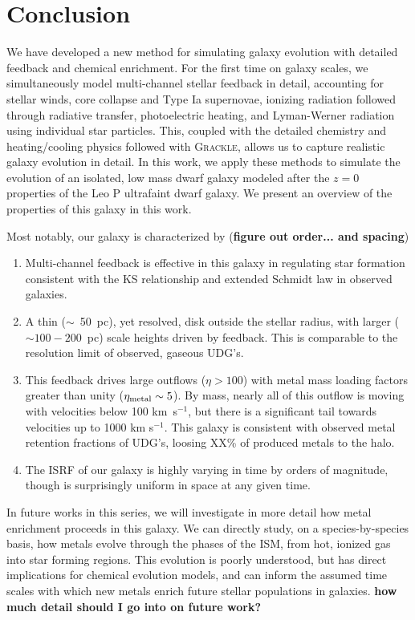 \documentclass[twocolumn]{aastex61}
\begin{document}
\section{Conclusion}
\label{sec:conclusion}
We have developed a new method for simulating galaxy evolution with detailed feedback and chemical enrichment. For the first time on galaxy scales, we simultaneously model multi-channel stellar feedback in detail, accounting for stellar winds, core collapse and Type Ia supernovae, ionizing radiation followed through radiative transfer, photoelectric heating, and Lyman-Werner radiation using individual star particles. This, coupled with the detailed chemistry and heating/cooling physics followed with \textsc{Grackle}, allows us to capture realistic galaxy evolution in detail. In this work, we apply these methods to simulate the evolution of an isolated, low mass dwarf galaxy modeled after the $z=0$ properties of the Leo P ultrafaint dwarf galaxy. We present an overview of the properties of this galaxy in this work.

Most notably, our galaxy is characterized by (\textbf{figure out order... and spacing})
\begin{enumerate}
\item Multi-channel feedback is effective in this galaxy in regulating star formation consistent with the KS relationship and extended Schmidt law in observed galaxies. 
\item A thin ($\sim$~50~pc), yet resolved, disk outside the stellar radius, with larger ($\sim 100 - 200$~pc) scale heights driven by feedback. This is comparable to the resolution limit of observed, gaseous UDG's.
\item This feedback drives large outflows ($\eta > 100$) with metal mass loading factors greater than unity ($\eta_{\rm metal} \sim 5$). By mass, nearly all of this outflow is moving with velocities below 100 km~s$^{-1}$, but there is a significant tail towards velocities up to 1000 km s$^{-1}$. This galaxy is consistent with observed metal retention fractions of UDG's, loosing XX\% of produced metals to the halo.
\item The ISRF of our galaxy is highly varying in time by orders of magnitude, though is surprisingly uniform in space at any given time. 
\end{enumerate}

In future works in this series, we will investigate in more detail how metal enrichment proceeds in this galaxy. We can directly study, on a species-by-species basis, how metals evolve through the phases of the ISM, from hot, ionized gas into star forming regions. This evolution is poorly understood, but has direct implications for chemical evolution models, and can inform the assumed time scales with which new metals enrich future stellar populations in galaxies. \textbf{how much detail should I go into on future work?}
\end{document}
